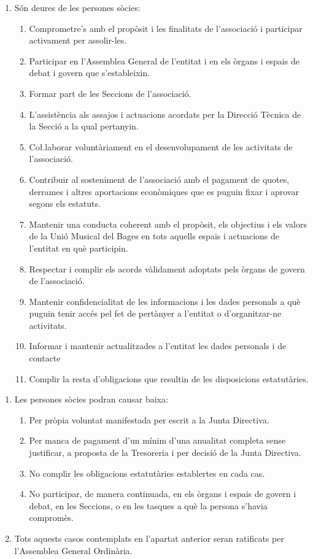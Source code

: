 \documentclass[11pt,a4paper]{article}
\newcommand{\UMB}{Unió Musical del Bages\xspace}
\newcommand{\JD}{Junta Directiva\xspace}
\newcommand{\AG}{Assemblea General\xspace}
\newcommand{\AGO}{Assemblea General Ordinària\xspace}
\newcommand{\DT}{Direcció Tècnica\xspace}
\begin{document}
\begin{enumerate}
    \item[] Són deures de les persones sòcies:
    \begin{enumerate}
        \item Comprometre's amb el propòsit i les finalitats de l'associació i participar activament per assolir-les.
        \item Participar en l'\AG de l'entitat i en els òrgans i espais de debat i govern que s'estableixin.
        \item Formar part de les Seccions de l'associació.
        \item L'assistència als assajos i actuacions acordats per la \DT de la Secció a la qual pertanyin.
        \item Co\l.laborar voluntàriament en el desenvolupament de les activitats de l'associació.
        \item Contribuir al sosteniment de l'associació amb el pagament de quotes, derrames i altres aportacions econòmiques que es puguin fixar i aprovar segons els estatuts.
        \item Mantenir una conducta coherent amb el propòsit, els objectius i els valors de la \UMB en tots aquells espais i actuacions de l'entitat en què participin.
        \item Respectar i complir els acords vàlidament adoptats pels òrgans de govern de l'associació.
        \item Mantenir confidencialitat de les informacions i les dades personals a què puguin tenir accés pel fet de pertànyer a l'entitat o d'organitzar-ne activitats.
        \item Informar i mantenir actualitzades a l'entitat les dades personals i de contacte
        \item Complir la resta d'obligacions que resultin de les disposicions estatutàries.
    \end{enumerate}
\end{enumerate}


\begin{enumerate}
    \item Les persones sòcies podran causar baixa:
    \begin{enumerate}
        \item Per pròpia voluntat manifestada per escrit a la \JD.
        \item Per manca de pagament d'un mínim d'una anualitat completa sense justificar, a proposta de la Tresoreria i per decisió de la \JD.
        \item No complir les obligacions estatutàries establertes en cada cas.
        \item No participar, de manera continuada, en els òrgans i espais de govern i debat, en les Seccions, o en les tasques a què la persona s'havia compromès.
    \end{enumerate}
    \item Tots aquests casos contemplats en l'apartat anterior seran ratificats per l'\AGO.
\end{enumerate}
\end{document}
